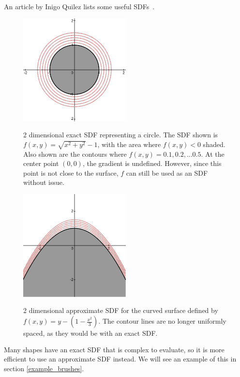 \documentclass[11pt]{article}
\begin{document}
An article by Inigo Quilez lists some useful SDFs~\cite{quilez:sdf}.

\begin{figure}
\caption{2 dimensional exact SDF representing a circle. The SDF shown is $f\left(x,y\right)=\sqrt{x^2+y^2}-1$, with the area where $f\left(x,y\right)<0$ shaded. Also shown are the contours where $f\left(x,y\right)=0.1,0.2,...0.5$. At the center point $\left(0,0\right)$, the gradient is undefined. However, since this point is not close to the surface, $f$ can still be used as an SDF without issue.}
\includegraphics[width=0.5\textwidth]{Circle_SDF}
\label{fig:Circle_SDF}
\end{figure}


\begin{figure}
\caption{2 dimensional approximate SDF for the curved surface defined by $f\left(x,y\right)=y-\left(1-\frac{x^2}{3}\right)$. The contour lines are no longer uniformly spaced, as they would be with an exact SDF.}
\includegraphics[width=0.5\textwidth]{Hill_SDF}
\label{fig:Hill_SDF}
\end{figure}

Many shapes have an exact SDF that is complex to evaluate, so it is more efficient to use an approximate SDF instead. We will see an example of this in section \ref{example_brushes}.
\end{document}
